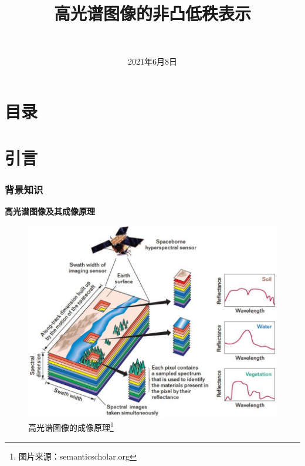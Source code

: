 \documentclass[10pt,aspectratio=43,mathserif]{beamer}
\title[高光谱图像的非凸低秩表示]{
	\fontsize{14pt}{25pt}\selectfont \textbf{高光谱图像的非凸低秩表示}
}
\subtitle{\fontsize{13pt}{14pt}\selectfont {在图像降噪方面的使用}}
\institute[SEU]{
	\fontsize{10pt}{11pt}\selectfont {东南大学{\quad}吴健雄学院}
}
\author[陈安皓]{
	\fontsize{13pt}{14pt}\selectfont {学生姓名：陈安皓}\\
	\fontsize{13pt}{14pt}\selectfont {指导教师：贾育衡}
}
\date[2021年6月8日]{
 2021年6月8日
}
\begin{document}
\begin{frame}
\titlepage
\end{frame}

\section*{目录}


\section[引言]{引言}

\begin{frame}
\frametitle{\textbf{背景知识}}
\begin{block}{\textbf{高光谱图像及其成像原理}}
\begin{figure}[H]
\centering
\includegraphics[scale=0.22]{img-principleofphotograph.png}
\caption{高光谱图像的成像原理\footnote{图片来源：semanticscholar.org}}
\end{figure}
\end{block}
\end{frame}
    
\end{document}
